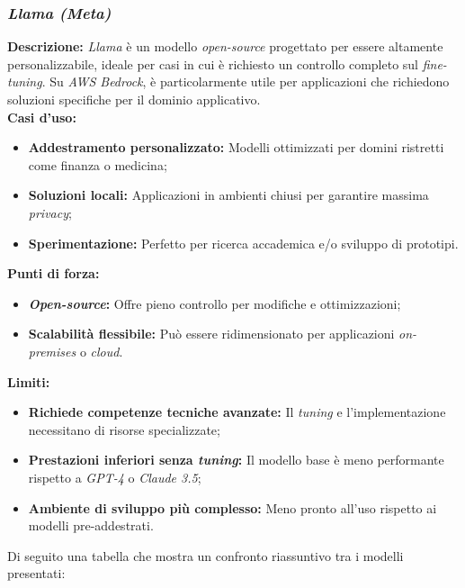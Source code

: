 \subsubsection{\textit{Llama (Meta)}}

\noindent \textbf{Descrizione:}
\textit{Llama} è un modello \textit{open-source} progettato per essere altamente personalizzabile, ideale per casi in cui è richiesto un controllo completo sul \textit{fine-tuning}. 
Su \textit{AWS Bedrock}, è particolarmente utile per applicazioni che richiedono soluzioni specifiche per il dominio applicativo.\\

\noindent \textbf{Casi d’uso:}
\begin{itemize}
    \item \textbf{Addestramento personalizzato:} Modelli ottimizzati per domini ristretti come finanza o medicina;
    \item \textbf{Soluzioni locali:} Applicazioni in ambienti chiusi per garantire massima \textit{privacy};
    \item \textbf{Sperimentazione:} Perfetto per ricerca accademica e/o sviluppo di prototipi.
\end{itemize}

\noindent \textbf{Punti di forza:}
\begin{itemize}
    \item \textbf{\textit{Open-source}:} Offre pieno controllo per modifiche e ottimizzazioni;
    \item \textbf{Scalabilità flessibile:} Può essere ridimensionato per applicazioni \textit{on-premises} o \textit{cloud}.
\end{itemize}

\noindent \textbf{Limiti:}
\begin{itemize}
    \item \textbf{Richiede competenze tecniche avanzate:} Il \textit{tuning} e l’implementazione necessitano di risorse specializzate;
    \item \textbf{Prestazioni inferiori senza \textit{tuning}:} Il modello base è meno performante rispetto a \textit{GPT-4} o \textit{Claude 3.5};
    \item \textbf{Ambiente di sviluppo più complesso:} Meno pronto all’uso rispetto ai modelli pre-addestrati.
\end{itemize}

\noindent Di seguito una tabella che mostra un confronto riassuntivo tra i modelli presentati:

